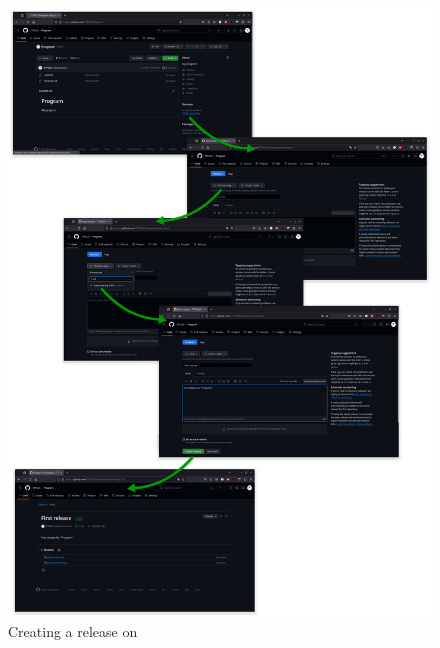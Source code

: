 \begin{figure}[!p]
\includegraphics[width=1.0\textwidth,keepaspectratio=true,draft=\ddst]{img/hosts/github/release.eps} 
\caption{Creating a release on \github\label{rgithub}}
\end{figure}

